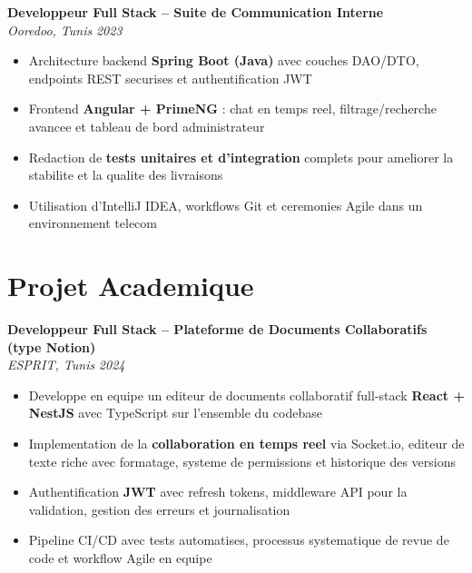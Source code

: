 \documentclass[10pt,a4paper]{article}
\begin{document}
{\vspace{4pt}
\textbf{Developpeur Full Stack -- Suite de Communication Interne} \\[1pt]
\textit{Ooredoo, Tunis} \hfill \textit{2023}
\begin{itemize}
  \item Architecture backend \textbf{Spring Boot (Java)} avec couches DAO/DTO, endpoints REST securises et authentification JWT
  \item Frontend \textbf{Angular + PrimeNG} : chat en temps reel, filtrage/recherche avancee et tableau de bord administrateur
  \item Redaction de \textbf{tests unitaires et d'integration} complets pour ameliorer la stabilite et la qualite des livraisons
  \item Utilisation d'IntelliJ IDEA, workflows Git et ceremonies Agile dans un environnement telecom
\end{itemize}

}

\section*{Projet Academique}
{\small
\textbf{Developpeur Full Stack -- Plateforme de Documents Collaboratifs (type Notion)} \\[1pt]
\textit{ESPRIT, Tunis} \hfill \textit{2024}
\begin{itemize}
  \item Developpe en equipe un editeur de documents collaboratif full-stack \textbf{React + NestJS} avec TypeScript sur l'ensemble du codebase
  \item Implementation de la \textbf{collaboration en temps reel} via Socket.io, editeur de texte riche avec formatage, systeme de permissions et historique des versions
  \item Authentification \textbf{JWT} avec refresh tokens, middleware API pour la validation, gestion des erreurs et journalisation
  \item Pipeline CI/CD avec tests automatises, processus systematique de revue de code et workflow Agile en equipe
\end{itemize}
}

\end{document}

